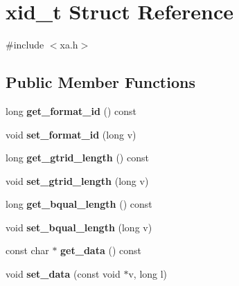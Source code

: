 \hypertarget{structxid__t}{}\section{xid\+\_\+t Struct Reference}
\label{structxid__t}


{\ttfamily \#include $<$xa.\+h$>$}

\subsection*{Public Member Functions}
\begin{DoxyCompactItemize}
\item 
\mbox{\label{structxid__t_ae5b9aa2b9e3d4df0d9e4d7439cd0a63b}} 
long {\bfseries get\+\_\+format\+\_\+id} () const
\item 
\mbox{\label{structxid__t_a95e7d34f2bfff1484a8e89c8a17ccdc3}} 
void {\bfseries set\+\_\+format\+\_\+id} (long v)
\item 
\mbox{\label{structxid__t_a00213aecca77a4b09d2e88f3748834ca}} 
long {\bfseries get\+\_\+gtrid\+\_\+length} () const
\item 
\mbox{\label{structxid__t_a096324f87898c17e3e3852f6cc967fae}} 
void {\bfseries set\+\_\+gtrid\+\_\+length} (long v)
\item 
\mbox{\label{structxid__t_a953828911d93ce00c7fe536612593c0d}} 
long {\bfseries get\+\_\+bqual\+\_\+length} () const
\item 
\mbox{\label{structxid__t_adbeb627cb082558acca8ae9175ef28d4}} 
void {\bfseries set\+\_\+bqual\+\_\+length} (long v)
\item 
\mbox{\label{structxid__t_afd54a30fefde31b73f0cf71ea3901343}} 
const char $\ast$ {\bfseries get\+\_\+data} () const
\item 
\mbox{\label{structxid__t_a630e2fef5aa8084870d7920316af6295}} 
void {\bfseries set\+\_\+data} (const void $\ast$v, long l)
\item 
\mbox{\label{structxid__t_a6cb45022f0f205eb4db99eca42d1cf29}} 

\end{DoxyCompactItemize}
